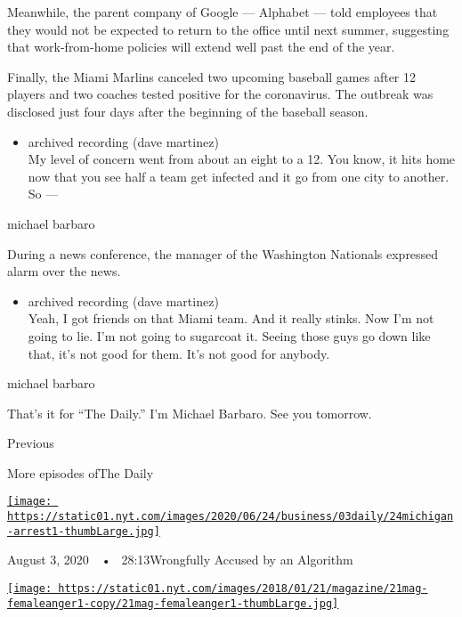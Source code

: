 Meanwhile, the parent company of Google --- Alphabet --- told employees
that they would not be expected to return to the office until next
summer, suggesting that work-from-home policies will extend well past
the end of the year.

Finally, the Miami Marlins canceled two upcoming baseball games after 12
players and two coaches tested positive for the coronavirus. The
outbreak was disclosed just four days after the beginning of the
baseball season.

\begin{itemize}
\tightlist
\item
  archived recording (dave martinez)\\
  My level of concern went from about an eight to a 12. You know, it
  hits home now that you see half a team get infected and it go from one
  city to another. So ---
\end{itemize}

michael barbaro

During a news conference, the manager of the Washington Nationals
expressed alarm over the news.

\begin{itemize}
\tightlist
\item
  archived recording (dave martinez)\\
  Yeah, I got friends on that Miami team. And it really stinks. Now I'm
  not going to lie. I'm not going to sugarcoat it. Seeing those guys go
  down like that, it's not good for them. It's not good for anybody.
\end{itemize}

michael barbaro

That's it for ``The Daily.'' I'm Michael Barbaro. See you tomorrow.

Previous

More episodes ofThe Daily

\href{https://www.nytimes.com/2020/08/03/podcasts/the-daily/algorithmic-justice-racism.html?action=click\&module=audio-series-bar\&region=header\&pgtype=Article}{\texttt{[image: https://static01.nyt.com/images/2020/06/24/business/03daily/24michigan-arrest1-thumbLarge.jpg]}}

August 3, 2020~~•~ 28:13Wrongfully Accused by an Algorithm

\href{https://www.nytimes.com/2020/08/02/podcasts/the-daily/on-female-rage.html?action=click\&module=audio-series-bar\&region=header\&pgtype=Article}{\texttt{[image: https://static01.nyt.com/images/2018/01/21/magazine/21mag-femaleanger1-copy/21mag-femaleanger1-thumbLarge.jpg]}}

